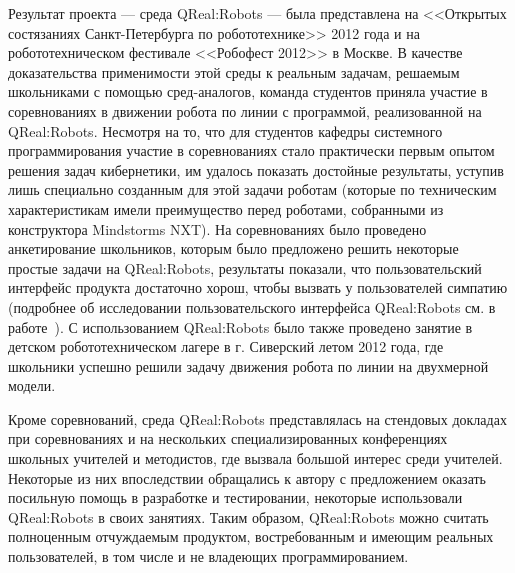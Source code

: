 Результат проекта --- среда QReal:Robots --- была представлена на <<Открытых состязаниях 
Санкт-Петербурга по робототехнике>> 2012 года и на робототехническом фестивале <<Робофест 2012>> 
в Москве. В качестве доказательства применимости этой среды к реальным задачам, решаемым 
школьниками с помощью сред-аналогов, команда студентов приняла участие в соревнованиях 
в движении робота по линии с программой, реализованной на QReal:Robots. Несмотря на 
то, что для студентов кафедры системного программирования участие в соревнованиях 
стало практически первым опытом решения задач кибернетики, им удалось показать достойные 
результаты, уступив лишь специально созданным для этой задачи роботам (которые 
по техническим характеристикам имели преимущество перед роботами, собранными из конструктора 
Mindstorms NXT). На соревнованиях было проведено анкетирование школьников, которым 
было предложено решить некоторые простые задачи на QReal:Robots, результаты показали, 
что пользовательский интерфейс продукта достаточно хорош, чтобы вызвать у пользователей 
симпатию (подробнее об исследовании пользовательского интерфейса QReal:Robots см. в работе~\cite{sokovikova2012usability}). 
С использованием QReal:Robots было также проведено занятие в детском робототехническом 
лагере в г. Сиверский летом 2012 года, где школьники успешно решили задачу движения 
робота по линии на двухмерной модели.

Кроме соревнований, среда QReal:Robots представлялась на стендовых докладах при соревнованиях
и на нескольких специализированных конференциях школьных учителей и методистов, где 
вызвала большой интерес среди учителей. Некоторые из них впоследствии обращались 
к автору с предложением оказать посильную помощь в разработке и тестировании, некоторые 
использовали QReal:Robots в своих занятиях. Таким образом, QReal:Robots можно считать 
полноценным отчуждаемым продуктом, востребованным и имеющим реальных пользователей, 
в том числе и не владеющих программированием.
